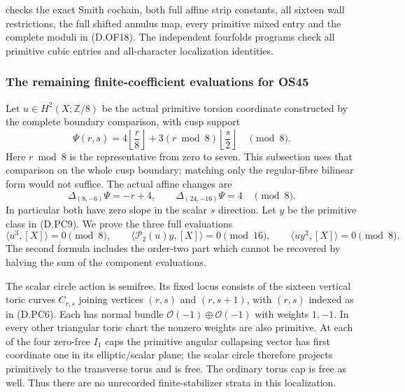  checks the exact Smith
cochain, both full affine strip constants, all sixteen wall
restrictions, the full shifted annulus map, every primitive
mixed entry and the complete moduli in (D.OF18).
The independent fourfolds programs check all primitive cubic
entries and all-character localization identities.

\subsubsection*{The remaining finite-coefficient evaluations for OS45}
Let $u\in H^2(X;\mathbb Z/8)$ be the actual primitive torsion
coordinate constructed by the complete boundary comparison, with
cusp support
\[
 \Psi(r,s)=4\left\lfloor\frac r8\right\rfloor
       +3(r\bmod8)\left\lfloor\frac s2\right\rfloor
                           \quad\pmod8.                  \tag{D.OL1}
\]
Here $r\bmod8$ is the representative from zero to seven. This
subsection uses that comparison on the whole cusp boundary;
matching only the regular-fibre bilinear form would not suffice.
The actual affine changes are
\[
 \Delta_{(8,-6)}\Psi=-r+4,\qquad
 \Delta_{(24,-16)}\Psi=4\quad\pmod8.                     \tag{D.OL2}
\]
In particular both have zero slope in the scalar $s$ direction.
Let $y$ be the primitive class in (D.PC9).
We prove the three full evaluations
\[
 \langle u^3,[X]\rangle=0\pmod8,\qquad
 \langle\mathcal P_2(u)y,[X]\rangle=0\pmod{16},\qquad
 \langle uy^2,[X]\rangle=0\pmod8.                         \tag{D.OL3}
\]
The second formula includes the order-two part which cannot be
recovered by halving the sum of the component evaluations.

The scalar circle action is semifree. Its fixed locus consists of
the sixteen vertical toric curves $C_{r,s}$ joining vertices
$(r,s)$ and $(r,s+1)$, with $(r,s)$ indexed as in (D.PC6).
Each has normal bundle $\mathcal O(-1)\oplus\mathcal O(-1)$
with weights $1,-1$. In every other triangular toric chart the
nonzero weights are also primitive. At each of the four zero-free
$I_1$ caps the primitive angular collapsing vector has first
coordinate one in its elliptic/scalar plane; the scalar circle
therefore projects primitively to the transverse torus and is
free. The ordinary torus cap is free as well. Thus there are no
unrecorded finite-stabilizer strata in this localization.

